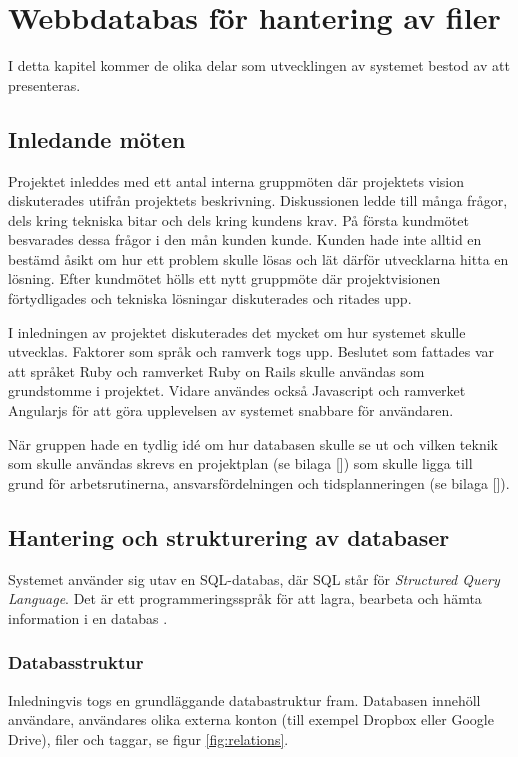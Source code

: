 \chapter{Webbdatabas för hantering av filer}
I detta kapitel kommer de olika delar som utvecklingen av systemet bestod av att presenteras. 

\section{Inledande möten}
Projektet inleddes med ett antal interna gruppmöten där projektets vision diskuterades utifrån projektets beskrivning. Diskussionen ledde till många frågor, dels kring tekniska bitar och dels kring kundens krav. På första kundmötet besvarades dessa frågor i den mån kunden kunde. Kunden hade inte alltid en bestämd åsikt om hur ett problem skulle lösas och lät därför utvecklarna hitta en lösning. Efter kundmötet hölls ett nytt gruppmöte där projektvisionen förtydligades och tekniska lösningar diskuterades och ritades upp. 

I inledningen av projektet diskuterades det mycket om hur systemet skulle utvecklas. Faktorer som språk och ramverk togs upp. Beslutet som fattades var att språket Ruby och ramverket Ruby on Rails skulle användas som grundstomme i projektet. Vidare användes också Javascript och ramverket Angularjs för att göra upplevelsen av systemet snabbare för användaren.

När gruppen hade en tydlig idé om hur databasen skulle se ut och vilken teknik som skulle användas skrevs en projektplan (se bilaga []) som skulle ligga till grund för arbetsrutinerna, ansvarsfördelningen och tidsplanneringen (se bilaga []).

\section{Hantering och strukturering av databaser}
Systemet använder sig utav en SQL-databas, där SQL står för \textit{Structured Query Language}. Det är ett programmeringsspråk för att lagra, bearbeta och hämta information i en databas \cite{sqlenc}.

\subsection{Databasstruktur}
Inledningvis togs en grundläggande databastruktur fram. Databasen innehöll användare, användares olika externa konton (till exempel Dropbox eller Google Drive), filer och taggar, se figur \ref{fig:relations}. 

